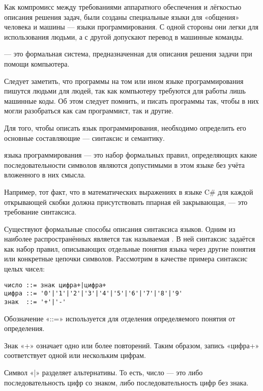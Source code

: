 Как компромисс между требованиями аппаратного обеспечения и лёгкостью
описания решения задач, были созданы специальные языки для «общения»
человека и машины — языки программирования. С одной стороны они легки
для использования людьми, а с другой допускают перевод в машинные
команды.

\begin{defn}
   — это формальная
  система, предназначенная для описания решения задачи при помощи
  компьютера.
\end{defn}

Следует заметить, что программы на том или ином языке программирования
пишутся людьми для людей, так как компьютеру требуются для работы лишь
машинные коды. Об этом следует помнить, и писать программы так, чтобы
в них могли разобраться как сам программист, так и другие.

Для того, чтобы описать язык программирования, необходимо определить
его основные составляющие — синтаксис и семантику.

\begin{defn}
   языка программирования — это набор
  формальных правил, определяющих какие последовательности символов
  являются допустимыми в этом языке без учёта вложенного в них смысла.
\end{defn}

Например, тот факт, что в математических выражениях в языке C\# для
каждой открывающей скобки должна присутствовать ппарная ей
закрывающая, — это требование синтаксиса.

Существуют формальные способы описания синтаксиса языков. Одним из
наиболее распространённых является так называемая . В ней синтаксис задаётся как
набор правил, описывающих отдельные понятия языка через другие понятия
или конкретные цепочки символов. Рассмотрим в качестве примера
синтаксис целых чисел:

\begin{verbatim}
число ::= знак цифра+|цифра+
цифра ::= '0'|'1'|'2'|'3'|'4'|'5'|'6'|'7'|'8'|'9'
знак  ::= '+'|'-'
\end{verbatim}

Обозначение «::=» используется для отделения определяемого понятия от
определения.

Знак «+» означает одно или более повторений. Таким образом, запись
«цифра+» соответствует одной или нескольким цифрам.

Символ «|» разделяет альтернативы. То есть, число — это либо
последовательность цифр со знаком, либо последовательность цифр без
знака.

